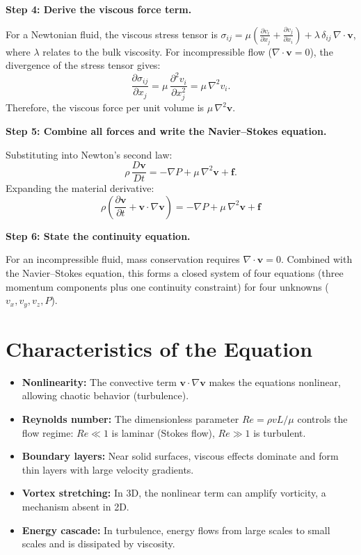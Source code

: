 \textbf{Step 4: Derive the viscous force term.}

For a Newtonian fluid, the viscous stress tensor is $\sigma_{ij} = \mu\!\left(\frac{\partial v_i}{\partial x_j} + \frac{\partial v_j}{\partial x_i}\right) + \lambda\,\delta_{ij}\,\nabla\cdot\mathbf{v}$, where $\lambda$ relates to the bulk viscosity. For incompressible flow ($\nabla\cdot\mathbf{v} = 0$), the divergence of the stress tensor gives:
\begin{equation}
\frac{\partial \sigma_{ij}}{\partial x_j} = \mu\,\frac{\partial^{2}v_i}{\partial x_j^{2}} = \mu\,\nabla^{2}v_i.
\end{equation}
Therefore, the viscous force per unit volume is $\mu\,\nabla^{2}\mathbf{v}$.

\textbf{Step 5: Combine all forces and write the Navier--Stokes equation.}

Substituting into Newton's second law:
\begin{equation}
\rho\,\frac{D\mathbf{v}}{Dt} = -\nabla P + \mu\,\nabla^{2}\mathbf{v} + \mathbf{f}.
\end{equation}
Expanding the material derivative:
\begin{equation}
\boxed{\;\rho\!\left(\frac{\partial \mathbf{v}}{\partial t} + \mathbf{v}\cdot\nabla\mathbf{v}\right) = -\nabla P + \mu\,\nabla^{2}\mathbf{v} + \mathbf{f}\;}
\end{equation}

\textbf{Step 6: State the continuity equation.}

For an incompressible fluid, mass conservation requires $\nabla\cdot\mathbf{v} = 0$. Combined with the Navier--Stokes equation, this forms a closed system of four equations (three momentum components plus one continuity constraint) for four unknowns ($v_x, v_y, v_z, P$).

\section*{Characteristics of the Equation}

\begin{itemize}
  \item \textbf{Nonlinearity:} The convective term $\mathbf{v}\cdot\nabla\mathbf{v}$ makes the equations nonlinear, allowing chaotic behavior (turbulence).
  \item \textbf{Reynolds number:} The dimensionless parameter $Re = \rho v L/\mu$ controls the flow regime: $Re \ll 1$ is laminar (Stokes flow), $Re \gg 1$ is turbulent.
  \item \textbf{Boundary layers:} Near solid surfaces, viscous effects dominate and form thin layers with large velocity gradients.
  \item \textbf{Vortex stretching:} In 3D, the nonlinear term can amplify vorticity, a mechanism absent in 2D.
  \item \textbf{Energy cascade:} In turbulence, energy flows from large scales to small scales and is dissipated by viscosity.
\end{itemize}
